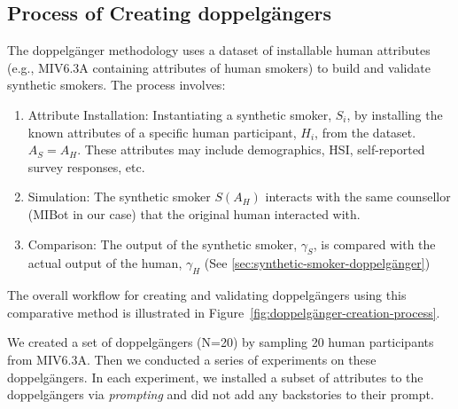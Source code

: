 \subsection{Process of Creating doppelgängers}
The doppelgänger methodology uses a dataset of installable human attributes (e.g., MIV6.3A containing attributes of human smokers) to build and validate synthetic smokers. The process involves:

\begin{enumerate}
    \item Attribute Installation: Instantiating a synthetic smoker, $S_i$, by installing the known attributes of a specific human participant, $H_i$, from the dataset. $A_S = A_H$. These attributes may include demographics, HSI, self-reported survey responses, etc.
    \item Simulation: The synthetic smoker $S(A_H)$ interacts with the same counsellor (MIBot in our case) that the original human interacted with.
    \item Comparison: The output of the synthetic smoker, $\gamma_S$, is compared with the actual output of the human, $\gamma_H$ (See \cref{sec:synthetic-smoker-doppelgänger})
\end{enumerate}



The overall workflow for creating and validating doppelgängers using this comparative method is illustrated in Figure~\ref{fig:doppelgänger-creation-process}.



We created a set of doppelgängers (N=20) by sampling 20 human participants from MIV6.3A. Then we conducted a series of experiments on these doppelgängers. In each experiment, we installed a subset of attributes to the doppelgängers via \emph{prompting} and did not add any backstories to their prompt.


